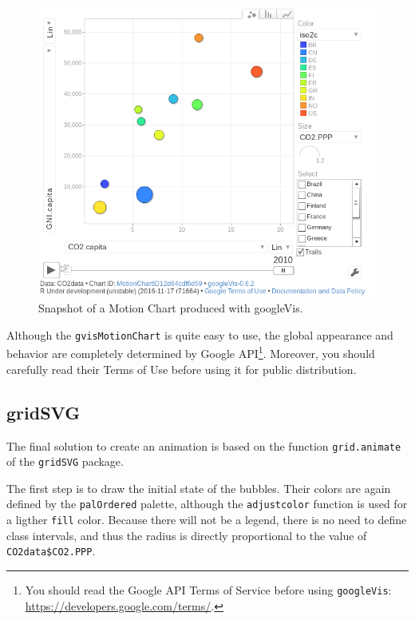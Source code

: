 \documentclass[smallroyalvopaper]{memoir}
\begin{document}
\begin{figure}[htbp]
\centering
\includegraphics[width=.9\linewidth]{figs/googleVis.png}
\caption{Snapshot of a Motion Chart produced with googleVis. \label{fig:googleVis}}
\end{figure}


Although the \texttt{gvisMotionChart} is quite easy to use, the global
appearance and behavior are completely determined by Google
API\footnote{You should read the Google API Terms of Service before using
\texttt{googleVis}: \url{https://developers.google.com/terms/}.}. Moreover, you should carefully read their Terms of Use
before using it for public distribution.

\subsection{\floweroneleft gridSVG \label{sec:gridSVG}}
\label{sec:orgb93555d}
The final solution to create an animation is based on the function
\texttt{grid.animate} of the \texttt{gridSVG} package. 

The first step is to draw the initial state of the bubbles. Their
colors are again defined by the \texttt{palOrdered} palette, although the
\texttt{adjustcolor} function is used for a ligther \texttt{fill} color. Because
there will not be a legend, there is no need to define class
intervals, and thus the radius is directly proportional to the value
of \texttt{CO2data\$CO2.PPP}.

\end{document}
